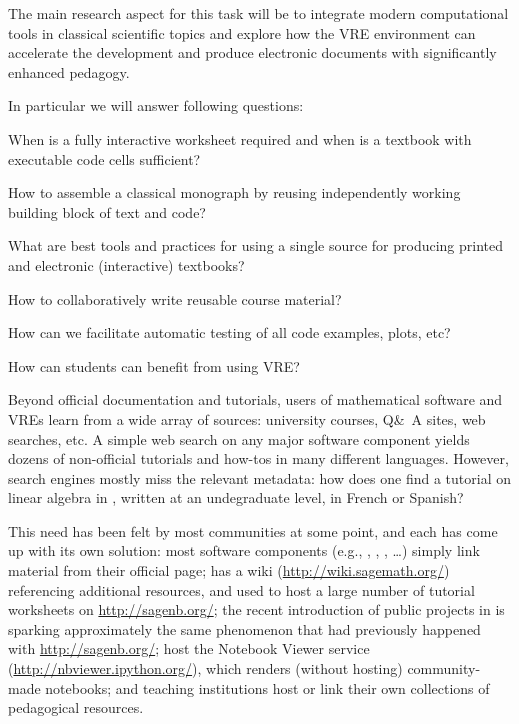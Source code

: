 \begin{workpackage}
\begin{tasklist}
\begin{task}[title=Demonstrator: Interactive books,
id=ibook,lead=US,partners={USO},PM=36,wphases={0-36,40-46}]
The main research aspect for this task will be to integrate modern
computational tools in classical scientific topics and explore how
the VRE environment can accelerate the development and produce electronic
documents with significantly enhanced pedagogy.

In particular we will answer following questions:
\begin{compactitem}
\item When is a fully interactive worksheet required and when is
  a textbook with executable code cells sufficient?
\item How to assemble a classical monograph by reusing independently working
  building block of text and code?
\item What are best tools and practices for using a single source for
  producing printed and electronic (interactive) textbooks?
\item How to collaboratively write reusable course material?
\item How can we facilitate automatic testing of all code examples, plots, etc?
\item How can students can benefit from using VRE?
\end{compactitem}


\end{task}

\begin{task}[title=Demonstrator: Computational mathematics resources indexing service,
id=index-librorum-salvificorum,lead=UV,PM=2,partners={UB}] Beyond official documentation and
  tutorials, users of mathematical software and VREs learn from a wide
  array of sources: university courses, Q\&\ A sites, web searches,
  etc.  A simple web search on any major software component yields
  dozens of non-official tutorials and how-tos in many different
  languages. However, search engines mostly miss the relevant
  metadata: how does one find a tutorial on linear algebra in \PariGP,
  written at an undegraduate level, in French or Spanish?

This need has been felt by most communities at some point, and each
has come up with its own solution: most software components (e.g.,
\GAP, \PariGP, \Sage, \dots) simply link material from their official
page; \Sage has a wiki (\url{http://wiki.sagemath.org/}) referencing
additional resources, and used to host a large number of tutorial
worksheets on \url{http://sagenb.org/}; the recent introduction of
public projects in \SMC is sparking approximately the same phenomenon
that had previously happened with \url{http://sagenb.org/}; \IPython
host the Notebook Viewer service (\url{http://nbviewer.ipython.org/}),
which renders (without hosting) community-made notebooks; and teaching
institutions host or link their own collections of pedagogical
resources.


\end{task}
\end{tasklist}
\end{workpackage}
